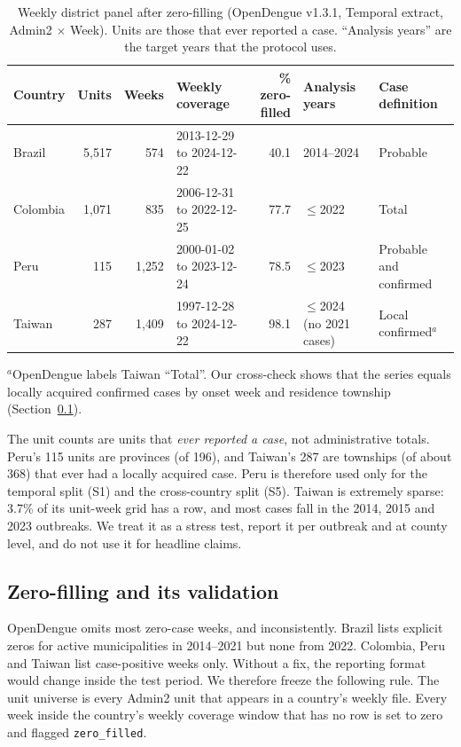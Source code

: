 \documentclass[11pt]{article}
\begin{document}
\begin{table}[t]
\centering\small
\caption{Weekly district panel after zero-filling (OpenDengue v1.3.1, Temporal extract,
Admin2 $\times$ Week). Units are those that ever reported a case. ``Analysis years'' are the
target years that the protocol uses.}
\label{tab:panel}
\begin{tabular}{lrrlrll}
\toprule
Country & Units & Weeks & Weekly coverage & \% zero-filled & Analysis years & Case definition \\
\midrule
Brazil   & 5{,}517 & 574   & 2013-12-29 to 2024-12-22 & 40.1 & 2014--2024 & Probable \\
Colombia & 1{,}071 & 835   & 2006-12-31 to 2022-12-25 & 77.7 & $\le$2022 & Total \\
Peru     & 115     & 1{,}252 & 2000-01-02 to 2023-12-24 & 78.5 & $\le$2023 & Probable and confirmed \\
Taiwan   & 287     & 1{,}409 & 1997-12-28 to 2024-12-22 & 98.1 & $\le$2024 (no 2021 cases) & Local confirmed$^{a}$ \\
\bottomrule
\end{tabular}

\smallskip
\footnotesize $^{a}$OpenDengue labels Taiwan ``Total''. Our cross-check shows that the series equals locally
acquired confirmed cases by onset week and residence township (Section~\ref{sec:zerofill}).
\end{table}

The unit counts are units that \emph{ever reported a case}, not administrative totals. Peru's
115 units are provinces (of 196), and Taiwan's 287 are townships (of about 368) that ever had a
locally acquired case. Peru is therefore used only for the temporal split (S1) and the
cross-country split (S5). Taiwan is extremely sparse: 3.7\% of its unit-week grid has a row, and most
cases fall in the 2014, 2015 and 2023 outbreaks. We treat it as a stress test, report it per
outbreak and at county level, and do not use it for headline claims.

\subsection{Zero-filling and its validation}
\label{sec:zerofill}
OpenDengue omits most zero-case weeks, and inconsistently. Brazil lists explicit zeros for active
municipalities in 2014--2021 but none from 2022. Colombia, Peru and Taiwan list case-positive
weeks only. Without a fix, the reporting format would change inside the test period. We
therefore freeze the following rule. The unit universe is every Admin2 unit that appears in a
country's weekly file. Every week inside the country's weekly coverage window that has no row
is set to zero and flagged \texttt{zero\_filled}.
\end{document}
